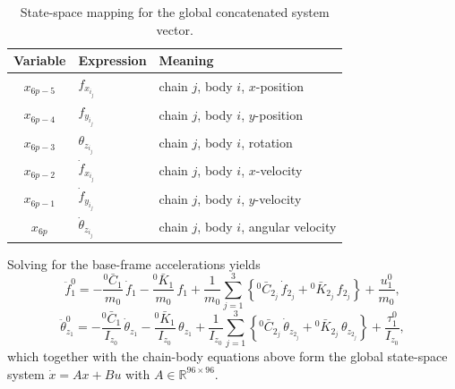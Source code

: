 \documentclass[11pt,letterpaper]{article}
\begin{document}
\begin{table}[H]
\centering
\caption{State-space mapping for the global concatenated system vector.}
\begin{tabular}{cll}
\toprule
Variable & Expression & Meaning \\
\midrule
$x_{6p-5}$  & $f_{x_{i_j}}$            & chain $j$, body $i$, $x$-position \\
$x_{6p-4}$  & $f_{y_{i_j}}$            & chain $j$, body $i$, $y$-position \\
$x_{6p-3}$  & $\theta_{z_{i_j}}$       & chain $j$, body $i$, rotation \\
$x_{6p-2}$  & $\dot{f}_{x_{i_j}}$      & chain $j$, body $i$, $x$-velocity \\
$x_{6p-1}$  & $\dot{f}_{y_{i_j}}$      & chain $j$, body $i$, $y$-velocity \\
$x_{6p}$    & $\dot{\theta}_{z_{i_j}}$ & chain $j$, body $i$, angular velocity \\
\bottomrule
\end{tabular}
\end{table}

Solving for the base-frame accelerations yields
\begin{equation}
    \ddot{f}^{0}_{1}
    = -\frac{{}^0\bar{C}_1}{m_0}\,\dot{f}_1
       -\frac{{}^0\bar{K}_1}{m_0}\,f_1
       +\frac{1}{m_0}\sum_{j=1}^{3}\!\left\{
           {}^0\bar{C}_{2_j}\,\dot{f}_{2_j} + {}^0\bar{K}_{2_j}\,f_{2_j}
       \right\}
       +\frac{u^0_{1}}{m_0},
\end{equation}
\begin{equation}
    \ddot{\theta}^{0}_{z_1}
    = -\frac{{}^0\bar{C}_1}{I_{z_0}}\,\dot{\theta}_{z_1}
       -\frac{{}^0\bar{K}_1}{I_{z_0}}\,\theta_{z_1}
       +\frac{1}{I_{z_0}}\sum_{j=1}^{3}\!\left\{
           {}^0\bar{C}_{2_j}\,\dot{\theta}_{z_{2_j}} + {}^0\bar{K}_{2_j}\,\theta_{z_{2_j}}
       \right\}
       +\frac{\tau^0_{1}}{I_{z_0}},
\end{equation}
which together with the chain-body equations above form the global state-space system $\dot{x} = Ax + Bu$ with $A \in \mathbb{R}^{96\times 96}$.
\end{document}
